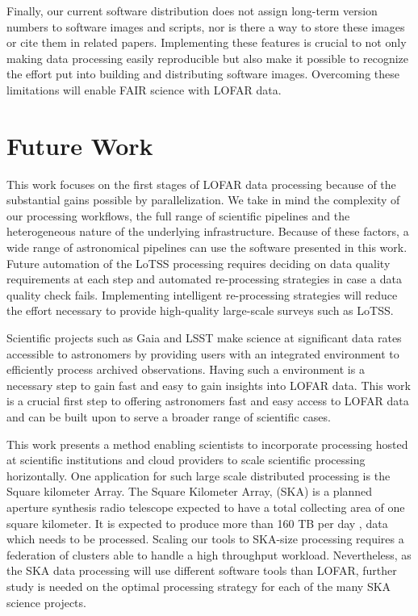 Finally, our current software distribution does not assign long-term version numbers to software images and scripts, nor is there a way to store these images or cite them in related papers. Implementing these features is crucial to not only making data processing easily reproducible but also make it possible to recognize the effort put into building and distributing software images. Overcoming these limitations will enable FAIR science with LOFAR data\citep{wilkinson2016fair}.


\section{Future Work}

This work focuses on the first stages of LOFAR data processing because of the substantial gains possible by parallelization. We take in mind the complexity of our processing workflows, the full range of scientific pipelines and the heterogeneous nature of the underlying infrastructure. Because of these factors, a wide range of astronomical pipelines can use the software presented in this work. Future automation of the LoTSS processing requires deciding on data quality requirements at each step and automated re-processing strategies in case a data quality check fails. Implementing intelligent re-processing strategies will reduce the effort necessary to provide high-quality large-scale surveys such as LoTSS. 

Scientific projects such as Gaia and LSST make science at significant data rates accessible to astronomers by providing users with an integrated environment to efficiently process archived observations. Having such a environment is a necessary step to gain fast and easy to gain insights into LOFAR data. This work is a crucial first step to offering astronomers fast and easy access to LOFAR data and can be built upon to serve a broader range of scientific cases.

This work presents a method enabling scientists to incorporate processing hosted at scientific institutions and cloud providers to scale scientific processing horizontally. One application for such large scale distributed processing is the Square kilometer Array. The Square Kilometer Array, (SKA) is a planned aperture synthesis radio telescope expected to have a total collecting area of one square kilometer. It is expected to produce more than 160 TB per day \citep{johnston2017taming}, data which needs to be processed. Scaling our tools to SKA-size processing requires a federation of clusters able to handle a high throughput workload. Nevertheless, as the SKA data processing will use different software tools than LOFAR, further study is needed on the optimal processing strategy for each of the many SKA science projects.

